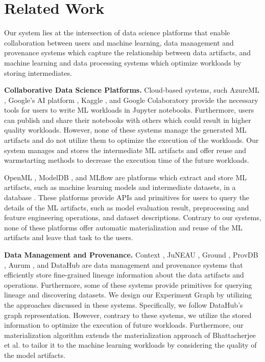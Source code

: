 \section{Related Work} \label{sec-related-work}
Our system lies at the intersection of data science platforms that enable collaboration between users and machine learning, data management and provenance systems which capture the relationship between data artifacts, and machine learning and data processing systems which optimize workloads by storing intermediates.

\textbf{Collaborative Data Science Platforms.}
Cloud-based systems, such AzureML \cite{team2016azureml}, Google's AI platform \cite{googleai}, Kaggle \cite{kagglewebsite}, and Google Colaboratory \cite{googlecolab} provide the necessary tools for users to write ML workloads in Jupyter notebooks.
Furthermore, users can publish and share their notebooks with others which could result in higher quality workloads.
However, none of these systems manage the generated ML artifacts and do not utilize them to optimize the execution of the workloads.
Our system manages and stores the intermediate ML artifacts and offer reuse and warmstarting methods to decrease the execution time of the future workloads.

OpenML \cite{vanschoren2014openml}, ModelDB \cite{vartak2016m}, and MLflow \cite{zaharia2018accelerating} are platforms which extract and store ML artifacts, such as machine learning models and intermediate datasets, in a database \cite{schelter2017automatically, Vanschoren2012}.
These platforms provide APIs and primitives for users to query the details of the ML artifacts, such as model evaluation result, preprocessing and feature engineering operations, and dataset descriptions.
Contrary to our systems, none of these platforms offer automatic materialization and reuse of the ML artifacts and leave that task to the users.

\textbf{Data Management and Provenance.}
Context \cite{garcia2018context}, JuNEAU \cite{ives2019dataset}, Ground \cite{hellerstein2017ground}, ProvDB \cite{miao2018provdb}, Aurum \cite{fernandez2018aurum}, and DataHub \cite{bhardwaj2014datahub, bhattacherjee2015principles} are data management and provenance systems that efficiently store fine-grained lineage information about the data artifacts and operations.
Furthermore, some of these systems provide primitives for querying lineage and discovering datasets.
We design our Experiment Graph by utilizing the approaches discussed in these systems.
Specifically, we follow DataHub's graph representation.
However, contrary to these systems, we utilize the stored information to optimize the execution of future workloads.
Furthermore, our materialization algorithm extends the materialization approach of Bhattacherjee et al. \cite{bhattacherjee2015principles} to tailor it to the machine learning workloads by considering the quality of the model artifacts.

